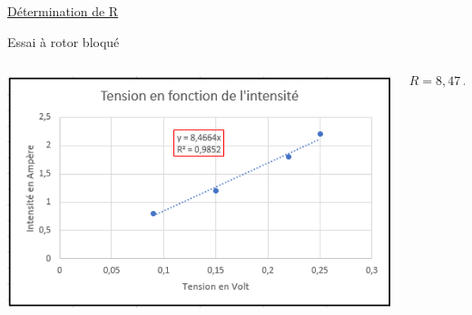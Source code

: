 \documentclass[french, handout]{beamer}
\begin{document}
            \begin{frame}{\hyperlink{pres_moteur}{Détermination de R}}
                \begin{block}{Essai à rotor bloqué}
                    \begin{columns}[c]
                    
                        \begin{column}{5 cm}
                            \includegraphics[width=6 cm, height = 3.5 cm]{tension-courant_deter_R.png}
                        \end{column}
                    
                        \begin{column}{4.5 cm}
                            \begin{tcolorbox}[colback=red!5!white,colframe=red!75!black,title=Equation]
                                \begin{center}
                                \end{center}
                            \end{tcolorbox}
                            \begin{tcolorbox}[colback=green!5!white,colframe=green!75!black,title=Résultat]
                                \[R=8,47~ \Omega\]
                            \end{tcolorbox}
                        \end{column}
                    \end{columns}
                \end{block}
            \end{frame}
\end{document}
